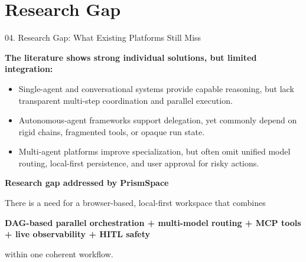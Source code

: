 \documentclass[aspectratio=169,10pt]{beamer}
\begin{document}
\section{Research Gap}

\begin{frame}[t]{04. Research Gap: What Existing Platforms Still Miss}
\vspace{0.25em}

\centering
\begin{minipage}{0.94\linewidth}
\fontsize{8.0}{10.2}\selectfont

\begin{tcolorbox}[
  enhanced, arc=4pt, colframe=lavenderDark!75, colback=lavenderLight!22,
  boxrule=0.7pt, left=9pt, right=9pt, top=7pt, bottom=7pt, width=\linewidth
]
\textbf{The literature shows strong individual solutions, but limited integration:}
\begin{itemize}\setlength{\itemsep}{4.5pt}
  \item Single-agent and conversational systems provide capable reasoning, but lack transparent multi-step coordination and parallel execution.
  \item Autonomous-agent frameworks support delegation, yet commonly depend on rigid chains, fragmented tools, or opaque run state.
  \item Multi-agent platforms improve specialization, but often omit unified model routing, local-first persistence, and user approval for risky actions.
\end{itemize}
\end{tcolorbox}

\vspace{0.35em}

\begin{tcolorbox}[
  enhanced, arc=4pt, colframe=prismTeal!80!black, colback=prismMint!55,
  boxrule=0.8pt, left=10pt, right=10pt, top=8pt, bottom=8pt, width=\linewidth
]
\centering
\textbf{Research gap addressed by PrismSpace}\par
\vspace{3pt}
\fontsize{8.6}{11}\selectfont
There is a need for a browser-based, local-first workspace that combines\par
\textbf{DAG-based parallel orchestration + multi-model routing + MCP tools + live observability + HITL safety}\par
within one coherent workflow.
\end{tcolorbox}

\end{minipage}
\end{frame}
\end{document}
